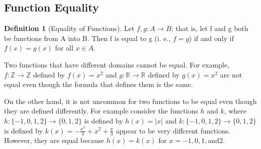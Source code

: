 \documentclass[10pt,]{book}
\theoremstyle{plain}
\theoremstyle{definition}
\newtheorem{definition}[theorem]{Definition}
\theoremstyle{definition}
\theoremstyle{definition}
\begin{document}
\subsection[Function Equality]{Function Equality}\label{ss-function-equality}
\begin{definition}[Equality of Functions]\label{def-equality-of-functions.}
 Let \(f, g:A \rightarrow  B\); that is, let f and g both be functions from A into B.  Then f is
equal to g (i. e., \(f=g\)) if and only if \(f(x) = g(x)\) for all \(x \in  A\).%
\end{definition}
Two functions that have different domains cannot be equal. For example,  \(f: \mathbb{Z}\to \mathbb{Z}\) defined by \(f(x)=x^2\) and \(g: \mathbb{R}\to
\mathbb{R}\) defined by \(g(x)=x^2\) are not equal even though the formula that defines them is the same.%
\par
On the other hand, it is not uncommon for two functions to be equal even though they are defined differently. For example consider the functions
\(h\) and \( k\), where \(h: \{-1,0,1,2\}\to \{0,1,2\}\) is defined by \(h(x)=|x|\) and \(k: \{-1,0,1,2\}\to \{0,1,2\}\)
is defined by \(k(x) = -\frac{x^3}{3}+x^2+\frac{x}{3}\) appear to be very different functions. However, they are equal because \(h(x)= k(x)\)
for \(x = -1, 0, 1, \text{and} 2\).%
\typeout{************************************************}
\typeout{************************************************}
\end{document}
